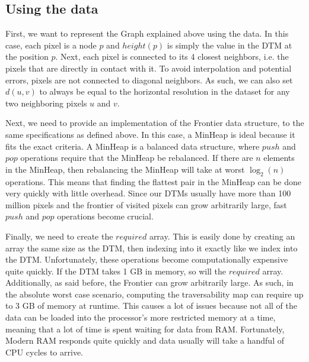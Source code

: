 \documentclass[12pt]{article}
\begin{document}
\subsection{Using the data}
\label{sub:using_the_data}
\par First, we want to represent the Graph explained above using the data. In this case, each pixel is a node $p$ and $height(p)$ is simply the value in the DTM at the position $p$. Next, each pixel is connected to its 4 closest neighbors, i.e. the pixels that are directly in contact with it. To avoid interpolation and potential errors, pixels are not connected to diagonal neighbors. As such, we can also set $d(u,v)$ to always be equal to the horizontal resolution in the dataset for any two neighboring pixels $u$ and $v$.
\par Next, we need to provide an implementation of the Frontier data structure, to the same specifications as defined above. In this case, a MinHeap is ideal because it fits the exact criteria. A MinHeap is a balanced data structure, where $push$ and $pop$ operations require that the MinHeap be rebalanced. If there are $n$ elements in the MinHeap, then rebalancing the MinHeap will take at worst $\log_2(n)$ operations. This means that finding the flattest pair in the MinHeap can be done very quickly with little overhead. Since our DTMs usually have more than 100 million pixels and the frontier of visited pixels can grow arbitrarily large, fast $push$ and $pop$ operations become crucial.
\par Finally, we need to create the $required$ array. This is easily done by creating an array the same size as the DTM, then indexing into it exactly like we index into the DTM. Unfortunately, these operations become computationally expensive quite quickly. If the DTM takes 1 GB in memory, so will the $required$ array. Additionally, as said before, the Frontier can grow arbitrarily large. As such, in the absolute worst case scenario, computing the traversability map can require up to 3 GB of memory at runtime. This causes a lot of issues because not all of the data can be loaded into the processor's more restricted memory at a time, meaning that a lot of time is spent waiting for data from RAM. Fortunately, Modern RAM responds quite quickly and data usually will take a handful of CPU cycles to arrive.
\end{document}
